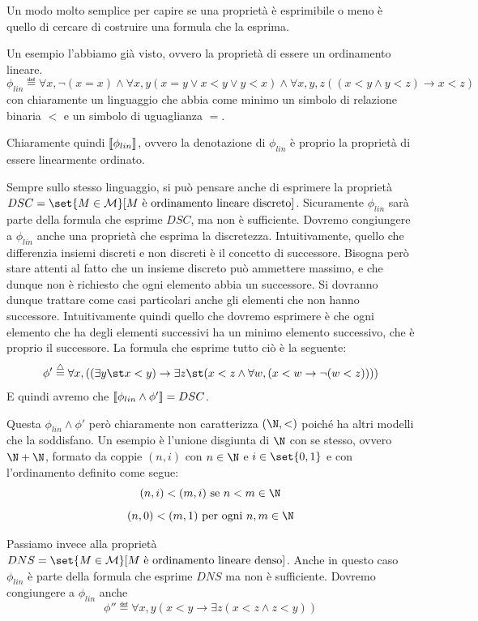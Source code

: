 Un modo molto semplice per capire se una proprietà è esprimibile o meno è quello di cercare di costruire una formula che la esprima. 

Un esempio l'abbiamo già visto, ovvero la proprietà di essere un ordinamento lineare.
\[\phi_{lin}\eqdef\forall x, \neg (x=x) \land \forall x,y (x=y\lor x<y \lor y<x) \land \forall x,y,z ((x<y \land y<z) \to x<z)\]
con chiaramente un linguaggio che abbia come minimo un simbolo di relazione binaria \(<\) e un simbolo di uguaglianza \(=\).

Chiaramente quindi \(\den{\phi_{lin}}\), ovvero la denotazione di \(\phi_{lin}\) è proprio la proprietà di essere linearmente ordinato.

Sempre sullo stesso linguaggio, si può pensare anche di esprimere la proprietà \(DSC = \set{M\in\mathcal{M}}[ M \text{ è ordinamento lineare discreto}]\). Sicuramente \(\phi_{lin}\) sarà parte della formula che esprime \(DSC\), ma non è sufficiente. Dovremo congiungere a \(\phi_{lin}\) anche una proprietà che esprima la discretezza. Intuitivamente, quello che differenzia insiemi discreti e non discreti è il concetto di successore. Bisogna però stare attenti al fatto che un insieme discreto può ammettere massimo, e che dunque non è richiesto che ogni elemento abbia un successore. Si dovranno dunque trattare come casi particolari anche gli elementi che non hanno successore. Intuitivamente quindi quello che dovremo esprimere è che ogni elemento che ha degli elementi successivi ha un minimo elemento successivo, che è proprio il successore. La formula che esprime tutto ciò è la seguente:
\[\phi' \eqdef \forall x, ((\exists y \st x< y) \to \exists z \st(x<z \land \forall w, (x<w \to \neg(w<z))))\]
E quindi avremo che \(\den{\phi_{lin} \land \phi'} = DSC\).

Questa \(\phi_{lin} \land \phi'\) però chiaramente non caratterizza \((\N,<)\) poiché ha altri modelli che la soddisfano. Un esempio è l'unione disgiunta di \(\N\) con se stesso, ovvero \(\N + \N\), formato da coppie \((n,i)\) con \(n \in \N\) e \(i \in \set{0,1}\) e con l'ordinamento definito come segue:
\[(n,i) < (m,i) \text{ se } n < m \in \N\]
\[(n,0) < (m,1) \text{ per ogni } n,m \in \N\]

Passiamo invece alla proprietà \(DNS = \set{M\in\mathcal{M}}[ M \text{ è ordinamento lineare denso}]\). Anche in questo caso \(\phi_{lin}\) è parte della formula che esprime \(DNS\) ma non è sufficiente. Dovremo congiungere a \(\phi_{lin}\) anche
\[\phi''\eqdef \forall x,y (x<y \to \exists z (x<z \land z<y))\]

